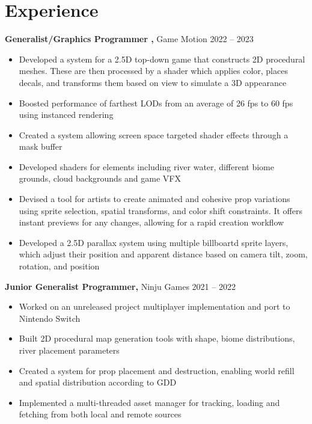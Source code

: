 \documentclass[10pt]{article}       %
\begin{document}
\section*{Experience}
\textbf{Generalist/Graphics Programmer ,} {Game Motion} \hfill 2022 -- 2023\\
\vspace{-9pt}
\begin{itemize}
	\item Developed a system for a 2.5D top-down game that constructs 2D procedural meshes. These
	      are then processed by a shader which applies color, places decals, and transforms them based on view
	      to simulate a 3D appearance
	\item Boosted performance of farthest LODs from an average of 26 fps to 60 fps using instanced rendering
	\item Created a system allowing screen space targeted shader effects through a mask buffer
	\item Developed shaders for elements including river water, different biome grounds, cloud backgrounds and game VFX
	\item Devised a tool for artists to create animated and cohesive prop variations using sprite
	      selection, spatial transforms, and color shift constraints. It offers instant previews
	      for any changes, allowing for a rapid creation workflow
	\item Developed a 2.5D parallax system using multiple billboartd sprite layers, which adjust their position and apparent distance based on camera tilt, zoom, rotation, and position
\end{itemize}

\textbf{Junior Generalist Programmer,}  {Ninju Games} \hfill 2021 -- 2022 \\
\vspace{-9pt}
\begin{itemize}
	\item Worked on an unreleased project multiplayer implementation and port to Nintendo Switch
	\item Built 2D procedural map generation tools with shape, biome distributions, river placement parameters
	\item Created a system for prop placement and destruction, enabling world refill and spatial distribution according to GDD
	\item Implemented a multi-threaded asset manager for tracking, loading and fetching from both local and remote sources
\end{itemize}
\end{document}
